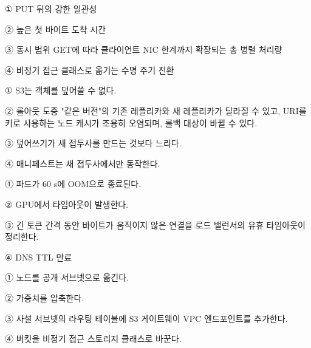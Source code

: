 \begin{tbboptions}
  \item ① PUT 뒤의 강한 일관성
  \item ② 높은 첫 바이트 도착 시간
  \item ③ 동시 범위 GET에 따라 클라이언트 NIC 한계까지 확장되는 총 병렬 처리량
  \item ④ 비정기 접근 클래스로 옮기는 수명 주기 전환
\end{tbboptions}


\begin{tbboptions}
  \item ① S3는 객체를 덮어쓸 수 없다.
  \item ② 롤아웃 도중 "같은 버전"의 기존 레플리카와 새 레플리카가 달라질 수 있고, URI를 키로 사용하는 노드 캐시가 조용히 오염되며, 롤백 대상이 바뀔 수 있다.
  \item ③ 덮어쓰기가 새 접두사를 만드는 것보다 느리다.
  \item ④ 매니페스트는 새 접두사에서만 동작한다.
\end{tbboptions}


\begin{tbboptions}
  \item ① 파드가 60 s에 OOM으로 종료된다.
  \item ② GPU에서 타임아웃이 발생한다.
  \item ③ 긴 토큰 간격 동안 바이트가 움직이지 않은 연결을 로드 밸런서의 유휴 타임아웃이 정리한다.
  \item ④ DNS TTL 만료
\end{tbboptions}


\begin{tbboptions}
  \item ① 노드를 공개 서브넷으로 옮긴다.
  \item ② 가중치를 압축한다.
  \item ③ 사설 서브넷의 라우팅 테이블에 S3 게이트웨이 VPC 엔드포인트를 추가한다.
  \item ④ 버킷을 비정기 접근 스토리지 클래스로 바꾼다.
\end{tbboptions}

